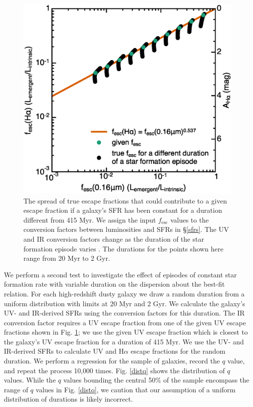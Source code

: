 \documentclass[referee]{aa}
\begin{document}
\begin{figure}[!ht]
\centering
\includegraphics[scale=0.5]{spread_hauv_age.eps}
\caption{The spread of true escape fractions that could contribute to
a given escape fraction if a galaxy's SFR has been constant for a
duration different from 415 Myr.  We assign the input
$f_{\mathrm{esc}}$ values to the conversion factors
between luminosities and SFRs in \S\ref{sfrs}.  The UV and IR conversion
factors change as the duration of the star formation episode varies \citep{madau14}.
The durations for the points shown here range from 20 Myr to
2 Gyr.\label{spread}}
\end{figure}

We perform a second test to investigate the effect of episodes of constant
star formation rate with variable duration on the dispersion about the best-fit
relation.  For each high-redshift dusty galaxy we draw a random duration from a
uniform distribution with limits at 20 Myr and 2 Gyr.  We calculate the
galaxy's UV- and IR-derived SFRs using the conversion factors for this duration.
The IR conversion factor requires a UV escape fraction from one of the given
UV escape fractions shown in Fig. \ref{spread}; we use the given UV escape
fraction which is closest to the galaxy's UV escape fraction for a duration
of 415 Myr.  We use the UV- and IR-derived SFRs to calculate UV and H$\alpha$
escape fractions for the random duration.  We perform a regression for the
sample of galaxies, record the $q$ value, and repeat the process 10,000 times.  Fig.
\ref{distq} shows the distribution of $q$ values.  While the
$q$ values bounding the central 50\% of the sample encompass the range of $q$
values in Fig. \ref{distq}, we caution that our assumption of a uniform
distribution of durations is likely incorrect.
\end{document}
